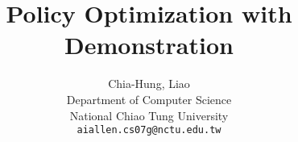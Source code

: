 \documentclass{article}
\title{Policy Optimization with Demonstration}
\author{%
  Chia-Hung, Liao\\
  Department of Computer Science\\
  National Chiao Tung University\\
  \texttt{aiallen.cs07g@nctu.edu.tw} \\

}
\begin{document}
\maketitle









{
\small


}
\end{document}
